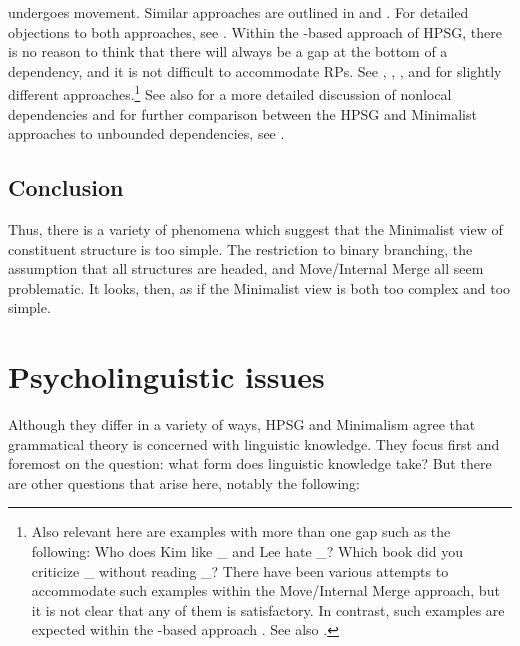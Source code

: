 \documentclass[output=paper,biblatex,babelshorthands,newtxmath,draftmode,colorlinks,citecolor=brown]{langscibook}
\begin{document}
undergoes movement. Similar approaches are outlined in \citet{AounChoueiriHornstein2001a-u} and
\citet{Boeckx.2003}. For detailed objections to both approaches, see
\citet[Section~3]{Borsley2013a-u}. Within the \slasch-based approach of HPSG, there is no reason to
think that there will always be a gap at the bottom of a dependency, and it is not difficult to
accommodate RPs. See \citet{Vaillette2001b}, \citet{Taghvaipour2010a-u}, \citet{Borsley2013a-u}, and \citet{crysmann_b10fg,Crysmann2016b-u} for slightly
different approaches.\footnote{%
	Also relevant here are examples with more than one gap such as the following:
	\eal
	\ex	Who does Kim like \_ and Lee hate \_?
	\ex	Which book did you criticize \_ without reading \_?
	\zl
	There have been various attempts to accommodate such examples within the Move/Internal Merge
        approach, but it is not clear that any of them is satisfactory. In contrast, such examples
        are expected within the \slasch-based approach \citep{LS2003a-u}. See also \citet[Section~4.6]{ps2}.%
}
See also  for a more detailed discussion of nonlocal dependencies and for
further comparison between the HPSG and Minimalist approaches to unbounded dependencies, see
.



\subsection{Conclusion}

Thus, there is a variety of phenomena which suggest that the Minimalist view of constituent structure
is too simple. The restriction to binary branching, the assumption that all structures are headed,
and Move/Internal Merge all seem problematic. It looks, then, as if the Minimalist view is both too
complex and too simple. 





\section{Psycholinguistic issues}
\label{sec-psycho}

Although they differ in a variety of ways, HPSG and Minimalism agree that grammatical theory is
concerned with linguistic knowledge. They focus first and foremost on the question: what form does
linguistic knowledge take? But there are other questions that arise here, notably the following: 
\end{document}
